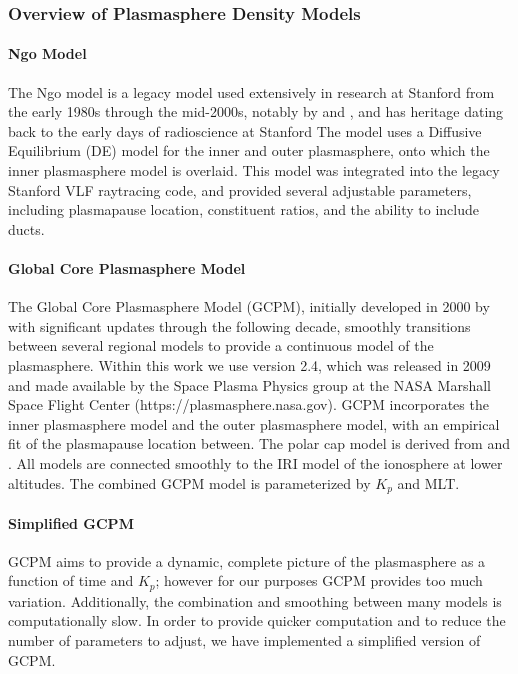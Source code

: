 \subsubsection{Overview of Plasmasphere Density Models}

\paragraph{Ngo Model}

The Ngo model is a legacy model used extensively in research at Stanford from the early 1980s through the mid-2000s, notably by \cite{Lauben1998} and \cite{Bortnik2005}, and has heritage dating back to the early days of radioscience at Stanford \citep{Kimura1966} The model uses a Diffusive Equilibrium (DE) model for the inner and outer plasmasphere, onto which the \cite{Carpenter1992} inner plasmasphere model is overlaid. This model was integrated into the legacy Stanford VLF raytracing code, and provided several adjustable parameters, including plasmapause location, constituent ratios, and the ability to include ducts.

\paragraph{Global Core Plasmasphere Model}

The Global Core Plasmasphere Model (GCPM), initially developed in 2000 by \cite{Gallagher1999} with significant updates through the following decade, smoothly transitions between several regional models to provide a continuous model of the plasmasphere. Within this work we use version 2.4, which was released in 2009 and made available by the Space Plasma Physics group at the NASA Marshall Space Flight Center (https://plasmasphere.nasa.gov). GCPM incorporates the \cite{Carpenter1992} inner plasmasphere model and the \cite{Gallagher1995} outer plasmasphere model, with an empirical fit of the plasmapause location between. The polar cap model is derived from \cite{Persoon1983} and \cite{Chandler1991}. All models are connected smoothly to the IRI model of the ionosphere at lower altitudes. The combined GCPM model is parameterized by $K_p$ and MLT.

\paragraph{Simplified GCPM}

GCPM aims to provide a dynamic, complete picture of the plasmasphere as a function of time and $K_p$; however for our purposes GCPM provides too much variation. Additionally, the combination and smoothing between many models is computationally slow. In order to provide quicker computation and to reduce the number of parameters to adjust, we have implemented a simplified version of GCPM.


